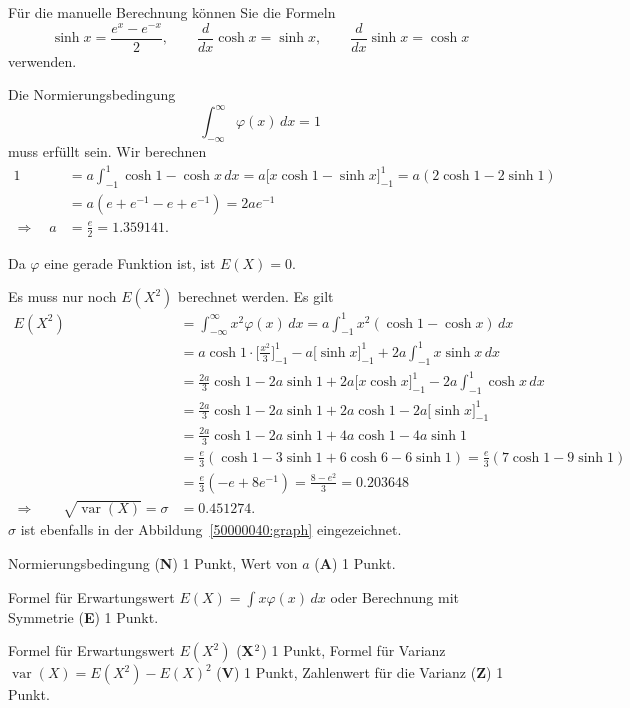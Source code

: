 \begin{hinweis}
Für die manuelle Berechnung können Sie die Formeln
\[
\sinh x = \frac{e^x - e^{-x}}2,\qquad
\frac{d}{dx}\cosh x = \sinh x, \qquad
\frac{d}{dx}\sinh x = \cosh x
\]
verwenden.
\end{hinweis}

\begin{loesung}
\begin{teilaufgaben}
\item
Die Normierungsbedingung
\[
\int_{-\infty}^\infty \varphi(x)\,dx =1
\]
muss erfüllt sein.
Wir berechnen
\begin{align*}
1
&=
a\int_{-1}^1 \cosh 1 - \cosh x\,dx
=
a\biggl[ x \cosh 1 - \sinh x\biggr]_{-1}^1
=
a(2\cosh1 -2\sinh 1)
\\
&=
a(e + e^{-1} - e + e^{-1})
=
2ae^{-1}
\\
\Rightarrow\quad
a&=\frac{e}{2}=1.359141.
\end{align*}
\item
Da $\varphi$ eine gerade Funktion ist, ist $E(X)=0$.
\item
Es muss nur noch $E(X^2)$ berechnet werden.
Es gilt
\begin{align*}
E(X^2)
&=
\int_{-\infty}^\infty x^2\varphi(x)\,dx
=
a\int_{-1}^1 x^2 (\cosh 1 - \cosh x)\,dx
\\
&=
a\cosh 1\cdot \biggl[\frac{x^2}{3}\biggr]_{-1}^1
-
a\biggl[\sinh x\biggr]_{-1}^{1}
+
2a\int_{-1}^1 x\sinh x\,dx
\\
&=
\frac{2a}{3}\cosh 1 - 2a\sinh 1
+2a\biggl[x\cosh x\biggr]_{-1}^1
-2a\int_{-1}^1 \cosh x\,dx
\\
&=
\frac{2a}{3}\cosh 1
 - 2a\sinh 1
+2a\cosh 1
-2a\biggl[\sinh x\biggr]_{-1}^1
\\
&=
\frac{2a}{3}\cosh 1
 - 2a\sinh 1
+4a\cosh 1
-4a\sinh 1
\\
&=
\frac{e}{3}
(\cosh 1 -3\sinh 1 + 6\cosh 6 - 6\sinh 1)
=
\frac{e}{3}(7\cosh 1 - 9 \sinh 1)
\\
&=
\frac{e}{3}(-e+8e^{-1})
=
\frac{8-e^2}{3}
=
0.203648
\\
\Rightarrow\qquad
\sqrt{\operatorname{var}(X)}
=
\sigma
&=
0.451274.
\end{align*}
$\sigma$ ist ebenfalls in der Abbildung~\ref{50000040:graph} eingezeichnet.
\qedhere
\end{teilaufgaben}
\end{loesung}

\begin{bewertung}
\begin{teilaufgaben}
\item
Normierungsbedingung ({\bf N}) 1 Punkt,
Wert von $a$ ({\bf A}) 1 Punkt.
\item
Formel für Erwartungswert $E(X)=\int x\varphi(x)\,dx$
oder Berechnung mit Symmetrie ({\bf E}) 1 Punkt.
\item
Formel für Erwartungswert $E(X^2)$  ({\bf X$\mathstrut^2$}) 1 Punkt,
Formel für Varianz $\operatorname{var}(X) = E(X^2)-E(X)^2$ ({\bf V}) 1 Punkt,
Zahlenwert für die Varianz ({\bf Z}) 1 Punkt.
\end{teilaufgaben}
\end{bewertung}


